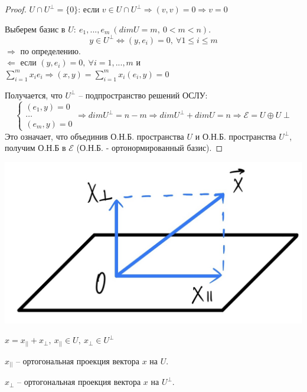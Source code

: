 \documentclass[a4paper, 12pt]{article}
\theoremstyle{definition}
\begin{document}
    \begin{proof}
        $U \cap U^\perp = \{0\}$: если $v \in U \cap U^\perp
        \Longrightarrow (v,v) = 0 \Longrightarrow v = 0$

        Выберем базис в $U:\ e_1,...,e_m\ (dimU = m,\ 
        0 < m < n).$
        $$y \in U^\perp \Longleftrightarrow (y, e_i) = 0,
        \ \forall 1 \leq i \leq m$$
        $\Longrightarrow $ по определению.\\
        $\Longleftarrow$ если $(y,e_i) = 0,\ \forall i = 
        1,...,m$ и $\sum\limits_{i=1}^{m} x_ie_i 
        \Longrightarrow (x,y) = \sum\limits_{i=1}^{m}
        x_i(e_i,y) = 0$

        Получается, что $U^\perp$ -- подпространство решений
        ОСЛУ:
        $$\begin{cases}
            (e_1,y) = 0\\\dots\\(e_m,y) = 0
        \end{cases} \Longrightarrow dimU^\perp = n - m
        \Longrightarrow dimU^\perp + dimU = n \Longrightarrow \mathcal{E} = U \oplus U\perp$$ 
        Это означает, что объединив О.Н.Б. пространства $U$
        и О.Н.Б. пространства $U^\perp$, получим О.Н.Б в 
        $\mathcal{E}$ (О.Н.Б. - ортонормированный базис).   
    \end{proof}
    \begin{center}
        \includegraphics[scale = 0.22]{images/picture.JPG}    
    \end{center}

    $x = x_{||} + x_\perp,\ x_{||} \in U,\ x_\perp \in 
    U^\perp$

    $x_{||}$ -- ортогональная проекция вектора $x$ на $U$.

    $x_\perp$ -- ортогональная проекция вектора $x$ на
    $U^\perp$.
\end{document}
